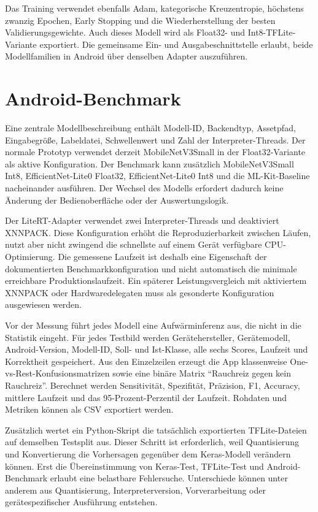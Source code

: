 Das Training verwendet ebenfalls Adam, kategorische Kreuzentropie, höchstens zwanzig Epochen, Early Stopping und die Wiederherstellung der besten Validierungsgewichte. Auch dieses Modell wird als Float32- und Int8-TFLite-Variante exportiert. Die gemeinsame Ein- und Ausgabeschnittstelle erlaubt, beide Modellfamilien in Android über denselben Adapter auszuführen.

\section{Android-Benchmark}

Eine zentrale Modellbeschreibung enthält Modell-ID, Backendtyp, Assetpfad, Eingabegröße, Labeldatei, Schwellenwert und Zahl der Interpreter-Threads. Der normale Prototyp verwendet derzeit MobileNetV3Small in der Float32-Variante als aktive Konfiguration. Der Benchmark kann zusätzlich MobileNetV3Small Int8, EfficientNet-Lite0 Float32, EfficientNet-Lite0 Int8 und die ML-Kit-Baseline nacheinander ausführen. Der Wechsel des Modells erfordert dadurch keine Änderung der Bedienoberfläche oder der Auswertungslogik.

Der LiteRT-Adapter verwendet zwei Interpreter-Threads und deaktiviert XNNPACK. Diese Konfiguration erhöht die Reproduzierbarkeit zwischen Läufen, nutzt aber nicht zwingend die schnellste auf einem Gerät verfügbare CPU-Optimierung. Die gemessene Laufzeit ist deshalb eine Eigenschaft der dokumentierten Benchmarkkonfiguration und nicht automatisch die minimale erreichbare Produktionslaufzeit. Ein späterer Leistungsvergleich mit aktiviertem XNNPACK oder Hardwaredelegaten muss als gesonderte Konfiguration ausgewiesen werden.

Vor der Messung führt jedes Modell eine Aufwärminferenz aus, die nicht in die Statistik eingeht. Für jedes Testbild werden Gerätehersteller, Gerätemodell, Android-Version, Modell-ID, Soll- und Ist-Klasse, alle sechs Scores, Laufzeit und Korrektheit gespeichert. Aus den Einzelzeilen erzeugt die App klassenweise One-vs-Rest-Konfusionsmatrizen sowie eine binäre Matrix \enquote{Rauchreiz gegen kein Rauchreiz}. Berechnet werden Sensitivität, Spezifität, Präzision, F1, Accuracy, mittlere Laufzeit und das 95-Prozent-Perzentil der Laufzeit. Rohdaten und Metriken können als CSV exportiert werden.

Zusätzlich wertet ein Python-Skript die tatsächlich exportierten TFLite-Dateien auf demselben Testsplit aus. Dieser Schritt ist erforderlich, weil Quantisierung und Konvertierung die Vorhersagen gegenüber dem Keras-Modell verändern können. Erst die Übereinstimmung von Keras-Test, TFLite-Test und Android-Benchmark erlaubt eine belastbare Fehlersuche. Unterschiede können unter anderem aus Quantisierung, Interpreterversion, Vorverarbeitung oder gerätespezifischer Ausführung entstehen.

